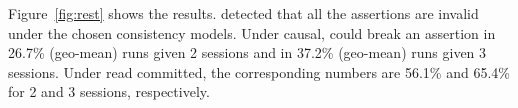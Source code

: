 Figure~\ref{fig:rest} shows the results. 
\tool{} detected that all the assertions are invalid under the chosen consistency models.
Under causal, \tool{} could break an assertion in 26.7\% (geo-mean) runs given 2 sessions and in 37.2\% (geo-mean) runs given 3 sessions.
Under read committed, the corresponding numbers are 56.1\% and 65.4\% for 2 and
3 sessions, respectively.

